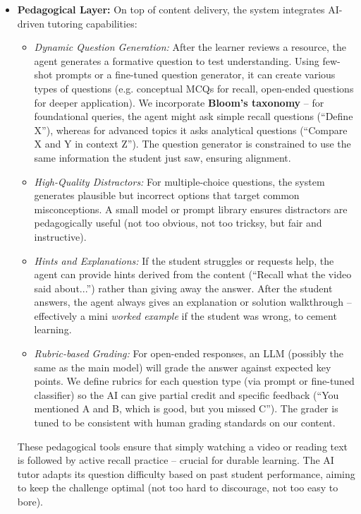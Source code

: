 \documentclass[11pt]{article}
\begin{document}
\begin{itemize}
  \item \textbf{Pedagogical Layer:} On top of content delivery, the system integrates AI-driven tutoring capabilities:
    \begin{itemize}
      \item \textit{Dynamic Question Generation:} After the learner reviews a resource, the agent generates a formative question to test understanding. Using few-shot prompts or a fine-tuned question generator, it can create various types of questions (e.g. conceptual MCQs for recall, open-ended questions for deeper application). We incorporate \textbf{Bloom's taxonomy} – for foundational queries, the agent might ask simple recall questions (“Define X”), whereas for advanced topics it asks analytical questions (“Compare X and Y in context Z”). The question generator is constrained to use the same information the student just saw, ensuring alignment.
      \item \textit{High-Quality Distractors:} For multiple-choice questions, the system generates plausible but incorrect options that target common misconceptions. A small model or prompt library ensures distractors are pedagogically useful (not too obvious, not too tricksy, but fair and instructive).
      \item \textit{Hints and Explanations:} If the student struggles or requests help, the agent can provide hints derived from the content (“Recall what the video said about...”) rather than giving away the answer. After the student answers, the agent always gives an explanation or solution walkthrough – effectively a mini \textit{worked example} if the student was wrong, to cement learning.
      \item \textit{Rubric-based Grading:} For open-ended responses, an LLM (possibly the same as the main model) will grade the answer against expected key points. We define rubrics for each question type (via prompt or fine-tuned classifier) so the AI can give partial credit and specific feedback (“You mentioned A and B, which is good, but you missed C”). The grader is tuned to be consistent with human grading standards on our content.
    \end{itemize}
    These pedagogical tools ensure that simply watching a video or reading text is followed by active recall practice – crucial for durable learning. The AI tutor adapts its question difficulty based on past student performance, aiming to keep the challenge optimal (not too hard to discourage, not too easy to bore).

\end{itemize}
\end{document}
